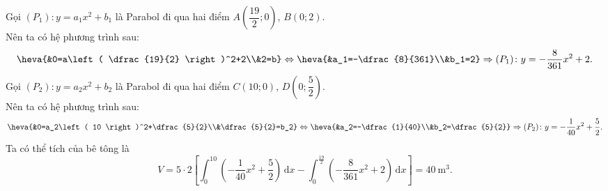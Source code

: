 \begin{ex}
{\begin{center}
\end{center}
Gọi $(P_1)\colon y=a_1 x^2+b_1$ là Parabol đi qua hai điểm $A\left( \dfrac{19}{2};0 \right)$, $B(0;2)$.\\
Nên ta có hệ phương trình sau:
\[\heva{&0=a\left( \dfrac{19}{2} \right)^2+2\\&2=b}
\Leftrightarrow \heva{&a_1=-\dfrac{8}{361}\\&b_1=2}
\Rightarrow (P_1)\colon y=-\dfrac{8}{361}{x^2}+2.\]
Gọi $(P_2)\colon y=a_2x^2+b_2$ là Parabol đi qua hai điểm $C\left( 10;0 \right)$, $D\left( 0;\dfrac{5}{2} \right)$.\\
Nên ta có hệ phương trình sau:
\[\heva{&0=a_2\left( 10 \right)^2+\dfrac{5}{2}\\&\dfrac{5}{2}=b_2}
\Leftrightarrow \heva{&a_2=-\dfrac{1}{40}\\&b_2=\dfrac{5}{2}}
\Rightarrow (P_2)\colon y=-\dfrac{1}{40} x^2+\dfrac{5}{2}.\]
Ta có thể tích của bê tông là
\[ V=5\cdot 2\left[ \int_0^{10} \left( -\dfrac{1}{40}{x^2}+\dfrac{5}{2} \right)\mathrm{\,d}x- \int_0^{\tfrac{19}{2}} \left( -\dfrac{8}{361}{x^2}+2 \right)\mathrm{\,d}x \right]
=40~\text{m}^3.\]
}
\end{ex}

